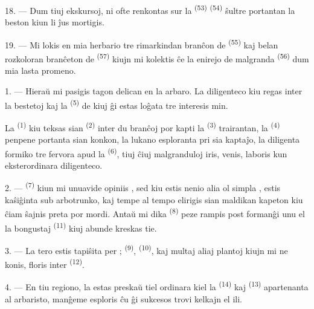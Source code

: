 18. --- Dum tiuj ekskursoj, ni ofte renkontas sur la 
\textsuperscript{(53)}  \textsuperscript{(54)} ŝultre
portantan la beston kiun li ĵus mortigis.

19. --- Mi lokis en mia herbario tre rimarkindan branĉon de 
\textsuperscript{(55)} kaj belan rozkoloran branĉeton de 
\textsuperscript{(57)} kiujn mi kolektis ĉe la enirejo de malgranda
 \textsuperscript{(56)} dum mia lasta promeno.

\VUsaut{3.0mm}
\VUsaut{3.0mm}

\VUsaut{3.0mm}

1. --- Hieraŭ mi pasigis tagon delican en la arbaro. La diligenteco kiu regas
inter la bestetoj kaj la  \textsuperscript{(5)} de kiuj ĝi
estas loĝata tre interesis min.

La  \textsuperscript{(1)} kiu teksas sian 
\textsuperscript{(2)} inter du branĉoj por kapti la 
\textsuperscript{(3)} trairantan, la  \textsuperscript{(4)}
penpene portanta sian konkon, la lukano esploranta pri sia kaptaĵo, la
diligenta formiko tre fervora apud la 
\textsuperscript{(6)}, tiuj ĉiuj malgranduloj iris, venis, laboris kun
eksterordinara diligenteco.

2. ---  \textsuperscript{(7)} kiun mi unuavide opiniis
, sed kiu estis nenio alia ol simpla , estis
kaŝiĝinta sub arbotrunko, kaj tempe al tempo elirigis sian maldikan kapeton kiu
ĉiam ŝajnis preta por mordi. Antaŭ mi dika 
\textsuperscript{(8)} peze rampis post formanĝi unu el la bongustaj
 \textsuperscript{(11)} kiuj abunde kreskas tie.

3. --- La tero estis tapiŝita per ; 
\textsuperscript{(9)},  \textsuperscript{(10)}, kaj multaj
aliaj plantoj kiujn mi ne konis, floris inter 
\textsuperscript{(12)}.

4. --- En tiu regiono, la  estas preskaŭ tiel ordinara kiel la
 \textsuperscript{(14)} kaj 
\textsuperscript{(13)} apartenanta al arbaristo, manĝeme esploris ĉu ĝi
sukcesos trovi kelkajn el ili.

